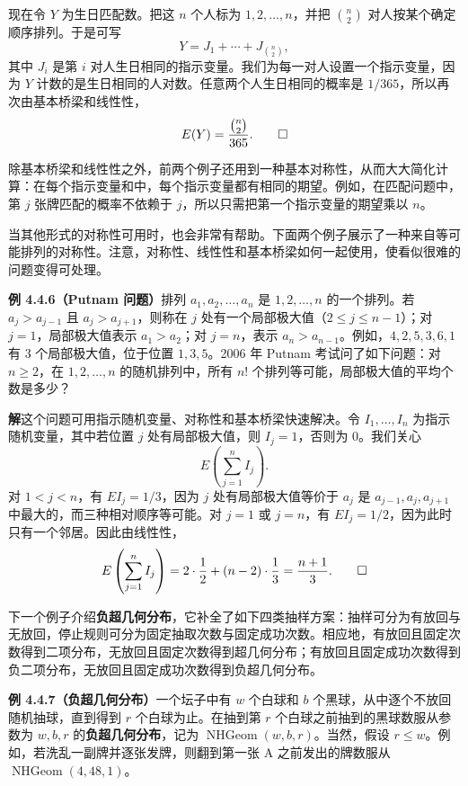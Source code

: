 \documentclass[UTF8,12pt,a4paper,fontset=fandol]{ctexart}
\begin{document}
现在令 $Y$ 为生日匹配数。把这 $n$ 个人标为 $1,2,\ldots,n$，并把 $\binom{n}{2}$ 对人按某个确定顺序排列。于是可写
\[
  Y=J_1+\cdots+J_{\binom{n}{2}},
\]
其中 $J_i$ 是第 $i$ 对人生日相同的指示变量。我们为每一对人设置一个指示变量，因为 $Y$ 计数的是生日相同的人对数。任意两个人生日相同的概率是 $1/365$，所以再次由基本桥梁和线性性，
\[
  E(Y)=\frac{\binom{n}{2}}{365}. \qed
\]

除基本桥梁和线性性之外，前两个例子还用到一种基本对称性，从而大大简化计算：在每个指示变量和中，每个指示变量都有相同的期望。例如，在匹配问题中，第 $j$ 张牌匹配的概率不依赖于 $j$，所以只需把第一个指示变量的期望乘以 $n$。

当其他形式的对称性可用时，也会非常有帮助。下面两个例子展示了一种来自等可能排列的对称性。注意，对称性、线性性和基本桥梁如何一起使用，使看似很难的问题变得可处理。

\noindent\textbf{例 4.4.6（Putnam 问题）}\quad 排列 $a_1,a_2,\ldots,a_n$ 是 $1,2,\ldots,n$ 的一个排列。若 $a_j>a_{j-1}$ 且 $a_j>a_{j+1}$，则称在 $j$ 处有一个局部极大值（$2\le j\le n-1$）；对 $j=1$，局部极大值表示 $a_1>a_2$；对 $j=n$，表示 $a_n>a_{n-1}$。例如，$4,2,5,3,6,1$ 有 $3$ 个局部极大值，位于位置 $1,3,5$。2006 年 Putnam 考试问了如下问题：对 $n\ge 2$，在 $1,2,\ldots,n$ 的随机排列中，所有 $n!$ 个排列等可能，局部极大值的平均个数是多少？

\noindent\textbf{解}\quad 这个问题可用指示随机变量、对称性和基本桥梁快速解决。令 $I_1,\ldots,I_n$ 为指示随机变量，其中若位置 $j$ 处有局部极大值，则 $I_j=1$，否则为 $0$。我们关心
\[
  E\left(\sum_{j=1}^n I_j\right).
\]
对 $1<j<n$，有 $EI_j=1/3$，因为 $j$ 处有局部极大值等价于 $a_j$ 是 $a_{j-1},a_j,a_{j+1}$ 中最大的，而三种相对顺序等可能。对 $j=1$ 或 $j=n$，有 $EI_j=1/2$，因为此时只有一个邻居。因此由线性性，
\[
  E\left(\sum_{j=1}^n I_j\right)
  =2\cdot\frac{1}{2}+(n-2)\cdot\frac{1}{3}
  =\frac{n+1}{3}. \qed
\]

下一个例子介绍\textbf{负超几何分布}，它补全了如下四类抽样方案：抽样可分为有放回与无放回，停止规则可分为固定抽取次数与固定成功次数。相应地，有放回且固定次数得到二项分布，无放回且固定次数得到超几何分布；有放回且固定成功次数得到负二项分布，无放回且固定成功次数得到负超几何分布。

\noindent\textbf{例 4.4.7（负超几何分布）}\quad 一个坛子中有 $w$ 个白球和 $b$ 个黑球，从中逐个不放回随机抽球，直到得到 $r$ 个白球为止。在抽到第 $r$ 个白球之前抽到的黑球数服从参数为 $w,b,r$ 的\textbf{负超几何分布}，记为 $\operatorname{NHGeom}(w,b,r)$。当然，假设 $r\le w$。例如，若洗乱一副牌并逐张发牌，则翻到第一张 A 之前发出的牌数服从 $\operatorname{NHGeom}(4,48,1)$。
\end{document}
